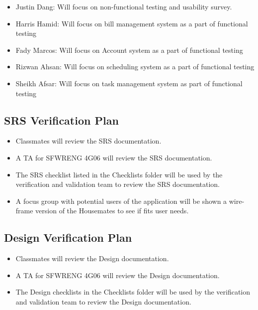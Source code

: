 \documentclass[12pt, titlepage]{article}
\begin{document}
\begin{itemize}
    \item Justin Dang: Will focus on non-functional testing and usability survey.
    \item Harris Hamid: Will focus on bill management system as a part of functional testing
    \item Fady Marcos: Will focus on Account system as a part of functional testing
    \item Rizwan Ahsan: Will focus on scheduling system as a part of functional testing 
    \item Sheikh Afsar: Will focus on task management system as part of functional testing
\end{itemize}



\subsection{SRS Verification Plan}

\begin{itemize}
    \item Classmates will review the SRS documentation.
    \item A TA for SFWRENG 4G06 will review the SRS documentation.
    \item The SRS checklist listed in the Checklists folder will be used by the verification and validation team to review the SRS documentation.
    \item A focus group with potential users of the application will be shown a wire-frame version of the Housemates to see if fits user needs.
\end{itemize}



\subsection{Design Verification Plan}


\begin{itemize}
    \item Classmates will review the Design documentation.
    \item A TA for SFWRENG 4G06 will review the Design documentation.
    \item The Design checklists in the Checklists folder will be used by the verification and validation team to review the Design documentation.
\end{itemize}
\end{document}
